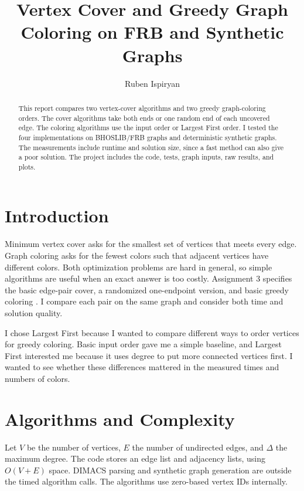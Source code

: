 \documentclass[acmsmall,nonacm]{acmart}
\begin{document}
\title{Vertex Cover and Greedy Graph Coloring on FRB and Synthetic Graphs}
\author{Ruben Ispiryan}
\authorsaddresses{}
\begin{abstract}
This report compares two vertex-cover algorithms and two greedy graph-coloring orders. The cover algorithms take both ends or one random end of each uncovered edge. The coloring algorithms use the input order or Largest First order. I tested the four implementations on BHOSLIB/FRB graphs and deterministic synthetic graphs. The measurements include runtime and solution size, since a fast method can also give a poor solution. The project includes the code, tests, graph inputs, raw results, and plots.
\end{abstract}
\maketitle

\section{Introduction}
Minimum vertex cover asks for the smallest set of vertices that meets every edge. Graph coloring asks for the fewest colors such that adjacent vertices have different colors. Both optimization problems are hard in general, so simple algorithms are useful when an exact answer is too costly. Assignment 3 specifies the basic edge-pair cover, a randomized one-endpoint version, and basic greedy coloring \cite{assignment}. I compare each pair on the same graph and consider both time and solution quality.

I chose Largest First because I wanted to compare different ways to order vertices for greedy coloring. Basic input order gave me a simple baseline, and Largest First interested me because it uses degree to put more connected vertices first. I wanted to see whether these differences mattered in the measured times and numbers of colors.

\section{Algorithms and Complexity}
Let $V$ be the number of vertices, $E$ the number of undirected edges, and $\Delta$ the maximum degree. The code stores an edge list and adjacency lists, using $O(V+E)$ space. DIMACS parsing and synthetic graph generation are outside the timed algorithm calls. The algorithms use zero-based vertex IDs internally.
\end{document}
